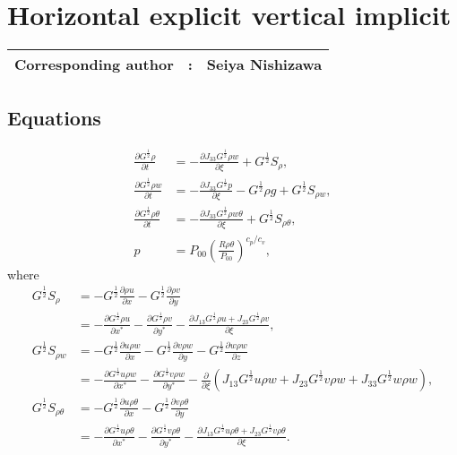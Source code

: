 \chapter{Horizontal explicit vertical implicit}
\label{chap:hevi}
{\bf \Large 
\begin{tabular}{ccc}
\hline
  Corresponding author & : & Seiya Nishizawa\\
\hline
\end{tabular}
}

\section{Equations}

\begin{align}
  \frac{\partial G^{\frac{1}{2}}\rho}{\partial t}
  &= -\frac{\partial J_{33}G^{\frac{1}{2}}\rho w}{\partial \xi} + G^{\frac{1}{2}}S_\rho, \\
  \frac{\partial G^{\frac{1}{2}}\rho w}{\partial t}
  &= -\frac{\partial J_{33}G^{\frac{1}{2}}p}{\partial \xi} -G^{\frac{1}{2}}\rho g + G^{\frac{1}{2}}S_{\rho w}, \\
  \frac{\partial G^{\frac{1}{2}}\rho\theta}{\partial t}
  &= -\frac{\partial J_{33}G^{\frac{1}{2}}\rho w\theta}{\partial \xi} + G^{\frac{1}{2}}S_{\rho\theta}, \\
  p &= P_{00}\left(\frac{R\rho\theta}{P_{00}}\right)^{c_p/c_v},
\end{align}
where
\begin{align}
  G^{\frac{1}{2}}S_\rho
  &= - G^{\frac{1}{2}}\frac{\partial \rho u}{\partial x}
     - G^{\frac{1}{2}}\frac{\partial \rho v}{\partial y} \nonumber\\
  &= - \frac{\partial G^{\frac{1}{2}}\rho u}{\partial x^*}
     - \frac{\partial G^{\frac{1}{2}}\rho v}{\partial y^*}
     - \frac{\partial J_{13}G^{\frac{1}{2}}\rho u + J_{23}G^{\frac{1}{2}}\rho v}{\partial \xi}, \\
  G^{\frac{1}{2}}S_{\rho w}
  &= - G^{\frac{1}{2}}\frac{\partial u\rho w}{\partial x}
     - G^{\frac{1}{2}}\frac{\partial v\rho w}{\partial y}
     - G^{\frac{1}{2}}\frac{\partial w\rho w}{\partial z} \nonumber\\
  &= - \frac{\partial G^{\frac{1}{2}}u\rho w}{\partial x^*}
     - \frac{\partial G^{\frac{1}{2}}v\rho w}{\partial y^*}
     - \frac{\partial}{\partial \xi}(J_{13}G^{\frac{1}{2}}u\rho w + J_{23}G^{\frac{1}{2}}v\rho w + J_{33}G^{\frac{1}{2}}w\rho w), \\
  G^{\frac{1}{2}}S_{\rho\theta}
  &= - G^{\frac{1}{2}}\frac{\partial u\rho\theta}{\partial x}
     - G^{\frac{1}{2}}\frac{\partial v\rho\theta}{\partial y} \nonumber\\
  &= - \frac{\partial G^{\frac{1}{2}}u\rho\theta}{\partial x^*}
     - \frac{\partial G^{\frac{1}{2}}v\rho\theta}{\partial y^*}
     - \frac{\partial J_{13}G^{\frac{1}{2}}u\rho\theta+J_{23}G^{\frac{1}{2}}v\rho\theta}{\partial \xi}.
\end{align}

